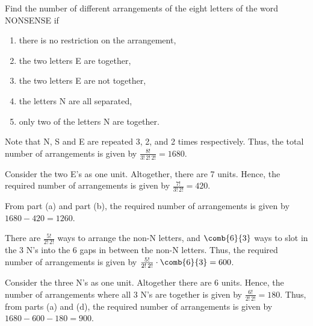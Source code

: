 \begin{problem}
    Find the number of different arrangements of the eight letters of the word NONSENSE if
    \begin{enumerate}
        \item there is no restriction on the arrangement,
        \item the two letters E are together,
        \item the two letters E are not together,
        \item the letters N are all separated,
        \item only two of the letters N are together.
    \end{enumerate}
\end{problem}
\begin{solution}
    \begin{ppart}
        Note that N, S and E are repeated 3, 2, and 2 times respectively. Thus, the total number of arrangements is given by $\frac{8!}{3! \, 2! \, 2!} = 1680$.
    \end{ppart}
    \begin{ppart}
        Consider the two E's as one unit. Altogether, there are 7 units. Hence, the required number of arrangements is given by $\frac{7!}{3! \, 2!} = 420$.
    \end{ppart}
    \begin{ppart}
        From part (a) and part (b), the required number of arrangements is given by $1680 - 420 = 1260$.
    \end{ppart}
    \begin{ppart}
        There are $\frac{5!}{2! \, 2!}$ ways to arrange the non-N letters, and $\comb{6}{3}$ ways to slot in the 3 N's into the 6 gaps in between the non-N letters. Thus, the required number of arrangements is given by $\frac{5!}{2! \, 2!} \cdot \comb{6}{3} = 600$.
    \end{ppart}
    \begin{ppart}
        Consider the three N's as one unit. Altogether there are 6 units. Hence, the number of arrangements where all 3 N's are together is given by $\frac{6!}{2! \, 2!} = 180$. Thus, from parts (a) and (d), the required number of arrangements is given by $1680 - 600 - 180 = 900$.
    \end{ppart}
\end{solution}

